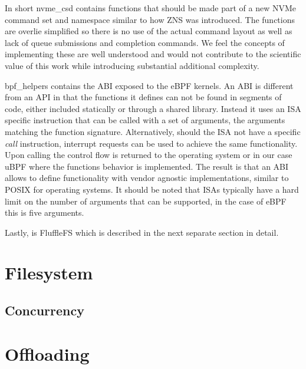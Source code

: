 In short nvme\_csd contains functions that should be made part of a new NVMe
command set and namespace \cite{nvme-command} similar to how ZNS was introduced.
The functions are overlie simplified so there is no use of the actual command
layout as well as lack of queue submissions and completion commands. We feel
the concepts of implementing these are well understood and would not contribute
to the scientific value of this work while introducing substantial additional
complexity.

bpf\_helpers contains the ABI exposed to the eBPF kernels. An ABI is different
from an API in that the functions it defines can not be found in segments of
code, either included statically or through a shared library. Instead it uses
an ISA specific instruction that can be called with a set of arguments, the
arguments matching the function signature. Alternatively, should the ISA not
have a specific \textit{call} instruction, interrupt requests can be used to
achieve the same functionality. Upon calling the control flow is returned to
the operating system or in our case uBPF where the functions behavior is
implemented. The result is that an ABI allows to define functionality with
vendor agnostic implementations, similar to POSIX for operating systems. It
should be noted that ISAs typically have a hard limit on the number of arguments
that can be supported, in the case of eBPF this is five arguments.

Lastly, is FluffleFS which is described in the next separate section in detail.

\section{Filesystem}


\subsection{Concurrency}

\section{Offloading}


